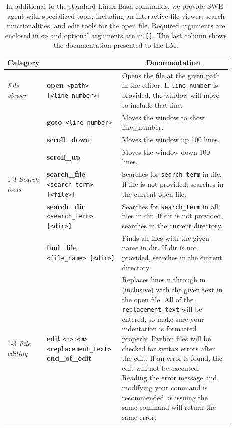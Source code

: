 \begin{table}[t]
\caption{
In additional to the standard Linux Bash commands, we provide SWE-agent with specialized tools, including an interactive file viewer, search functionalities, and edit tools for the open file. Required arguments are enclosed in \texttt{<>} and optional arguments are in \texttt{[]}. The last column shows the documentation presented to the LM.
}
\label{tab:commands}
\vspace{0.25em}
\centering
\begin{tabular}{p{0.08\linewidth}>{\raggedright\arraybackslash}p{0.33\linewidth}p{0.48\linewidth}}
\toprule
\multicolumn{1}{l}{Category}& \multicolumn{1}{c}{Command} & \multicolumn{1}{c}{Documentation} \\
\midrule
\textit{File viewer} & \textbf{open}\texttt{ <path> [<line\_number>]} & Opens the file at the given path in the editor. If \texttt{line\_number} is provided, the window will move to include that line. \\
\addlinespace
& \textbf{goto}\texttt{ <line\_number>} & Moves the window to show line\_number. \\
\addlinespace
& \textbf{scroll\_down} & Moves the window up 100 lines. \\
\addlinespace
& \textbf{scroll\_up} & Moves the window down 100 lines. \\
\cmidrule(lr){1-3}
\textit{Search tools} & \textbf{search\_file}\texttt{ <search\_term> [<file>]} & Searches for \texttt{search\_term} in file. If file is not provided, searches in the current open file. \\
\addlinespace
& \textbf{search\_dir}\texttt{ <search\_term> [<dir>]} & Searches for \texttt{search\_term} in all files in dir. If dir is not provided, searches in the current directory. \\
\addlinespace
& \textbf{find\_file}\texttt{ <file\_name> [<dir>]} & Finds all files with the given name in dir. If dir is not provided, searches in the current directory. \\
\cmidrule(lr){1-3}
\textit{File \mbox{editing}} & {\textbf{edit} \texttt{<n>:<m>}  \texttt{<replacement\_text>} \textbf{end\_of\_edit}} & Replaces lines n through m (inclusive) with the given text in the open file. All of the \texttt{replacement\_text} will be entered, so make sure your indentation is formatted properly. Python files will be checked for syntax errors after the edit. If an error is found, the edit will not be executed. Reading the error message and modifying your command is recommended as issuing the same command will return the same error. \\

\end{tabular}
\end{table}
